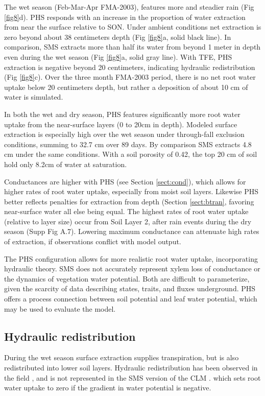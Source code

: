 \documentclass[draft,linenumbers]{agujournal}
\begin{document}
    The wet season (Feb-Mar-Apr FMA-2003), features more and steadier rain (Fig \ref{fig8}d). PHS responds with an increase in the proportion of water extraction from near the surface relative to SON. Under ambient conditions net extraction is zero beyond about 38 centimeters depth (Fig \ref{fig8}a, solid black line). In comparison, SMS extracts more than half its water from beyond 1 meter in depth even during the wet season (Fig \ref{fig8}a, solid gray line). With TFE, PHS extraction is negative beyond 20 centimeters, indicating hydraulic redistribution (Fig \ref{fig8}c). Over the three month FMA-2003 period, there is no net root water uptake below 20 centimeters depth, but rather a deposition of about 10 cm of water is simulated.
    
    In both the wet and dry season, PHS features significantly more root water uptake from the near-surface layers (0 to 20cm in depth). Modeled surface extraction is especially high over the wet season under through-fall exclusion conditions, summing to 32.7 cm over 89 days. By comparison SMS extracts 4.8 cm under the same conditions. With a soil porosity of 0.42, the top 20 cm of soil hold only 8.2cm of water at saturation.
    
    Conductances are higher with PHS (see Section \ref{sect:cond}), which allows for higher rates of root water uptake, especially from moist soil layers. Likewise PHS better reflects penalties for extraction from depth (Section \ref{sect:btran}, favoring near-surface water all else being equal. The highest rates of root water uptake (relative to layer size) occur from Soil Layer 2, after rain events during the dry season (Supp Fig A.7). Lowering maximum conductance can attenuate high rates of extraction, if observations conflict with model output.

    The PHS configuration allows for more realistic root water uptake, incorporating hydraulic theory. SMS does not accurately represent xylem loss of conductance or the dynamics of vegetation water potential. Both are difficult to parameterize, given the scarcity of data describing states, traits, and fluxes underground. PHS offers a process connection between soil potential and leaf water potential, which may be used to evaluate the model.

\subsection{Hydraulic redistribution}

    During the wet season surface extraction supplies transpiration, but is also redistributed into lower soil layers. Hydraulic redistribution has been observed in the field \citep{oliveira2005}, and is not represented in the SMS version of the CLM \citep{lee2005}. which sets root water uptake to zero if the gradient in water potential is negative. 
    
\end{document}
